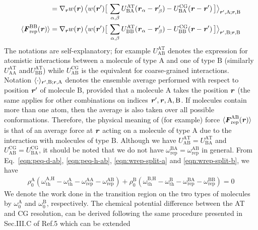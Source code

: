 \documentclass[a4paper,preprint,unsortedaddress]{revtex4-1}
\newcommand{\vect}[1]{\textbf{\textit{#1}}}
\newcommand{\AT}{{\textrm{{AT}}}}
\newcommand{\CG}{{\textrm{CG}}}
\newcommand{\thf}{{\textrm{th}}}
\newcommand{\res}{{\textrm{rep}}}
\newcommand{\hadress}{{\textrm{H}}}
\newcommand{\typea}{{\textrm{A}}}
\newcommand{\typeb}{{\textrm{B}}}
\begin{document}
{\begin{align}
  &=
  \nabla_{\vect r} w(\vect r)\,
  \big\langle w(\vect r')
  \big[\, \sum_{\alpha,\beta} U^\AT_{\typeb\typea}(\vect r_\alpha- \vect r'_\beta)
  - U^\CG_{\typeb\typea}(\vect r- \vect r') \,\big]
  \big\rangle_{\vect r',\typea; \vect r,\typeb}\\
  \langle \vect F^{\typeb\typeb}_\res(\vect r)\rangle
  &=
  \nabla_{\vect r} w(\vect r)\,
  \big\langle w(\vect r')
  \big[\, \sum_{\alpha,\beta} U^\AT_{\typeb\typeb}(\vect r_\alpha- \vect r'_\beta)
  - U^\CG_{\typeb\typeb}(\vect r- \vect r') \,\big]
  \big\rangle_{\vect r',\typeb; \vect r,\typeb}
\end{align}
The notations are self-explanatory; for example $ U^\AT_{\typea\typeb}$
denotes the expression for atomistic interactions between a molecule of type $\typea$ and one of type $\typeb$ (similarly $ U^\AT_{\typea\typea}$ and$ U^\AT_{\typeb\typeb}$) while $ U^\CG_{\typea\typeb}$ is the equivalent for coarse-grained interactions.
Notation $\langle\cdot\rangle_{\vect r',\typeb; \vect r,\typea}$ denotes the
ensemble average performed with respect to position $\vect r'$ of molecule
$\typeb$, provided that a molecule $\typea$ takes the position $\vect r$ (the same applies for other combinations on indices ${\vect r'}, {\vect r}, {\typea}, {\typeb}$.
If molecules contain more than one atom, then the average is also taken
over all possible conformations.
Therefore, the physical meaning of (for example) 
force $\langle \vect F^{\typea\typeb}_\res(\vect r)\rangle$
is that of an average force at $\vect r$ acting on a molecule of type $\typea$  due to the interaction with molecules of type $\typeb$.
Although we have $U^\AT_{\typea\typeb} = U^\AT_{\typeb\typea}$ and
$U^\CG_{\typea\typeb} = U^\CG_{\typeb\typea}$, it should
be noted that we do not have
$\omega_\res^{\typeb\typea} = \omega_\res^{\typea\typeb}$  in general.
From Eq.~\eqref{eqn:peq-d-ab}, \eqref{eqn:peq-h-ab},
\eqref{eqn:wrep-split-a} and \eqref{eqn:wrep-split-b}, we have
\begin{align}\label{eqn:hd-rel-ab}
  \rho_0^\typea(\omega_\thf^{\typea,\hadress} - \omega_\thf^\typea
  - \omega^{\typea\typea}_\res - \omega^{\typea\typeb}_\res)
  +
  \rho_0^\typeb(\omega_\thf^{\typeb,\hadress} - \omega_\thf^\typeb
  - \omega^{\typeb\typea}_\res - \omega^{\typeb\typeb}_\res) = 0
\end{align}
We denote the work done in the transition region on the two types
of molecules by $\omega_0^\typea$ and $\omega_0^\typeb$, respectively.
The chemical potential difference between the AT and CG resolution,
can be derived following the same procedure presented in Sec.III.C of Ref.5 which can be extended
}
\end{document}
